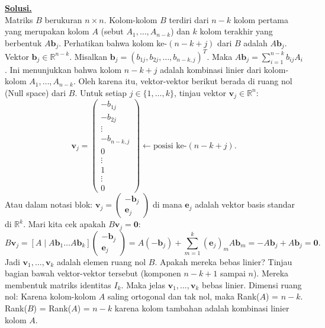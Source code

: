\documentclass[12pt,twoside]{article}
\newenvironment{solution}
{
	\par\noindent\textbf{\underline{Solusi.}}\\
}
{
	\par
}
\begin{document}
\begin{enumerate}
        \begin{solution}
          Matriks $B$ berukuran $n \times n$. Kolom-kolom $B$ terdiri dari $n-k$ kolom pertama yang merupakan kolom $A$ (sebut $A_1, \dots, A_{n-k}$) dan $k$ kolom terakhir yang berbentuk $A\mathbf{b}_j$.
          Perhatikan bahwa kolom ke-$(n-k+j)$ dari $B$ adalah $A\mathbf{b}_j$.
          Vektor $\mathbf{b}_j \in \mathbb{R}^{n-k}$. Misalkan $\mathbf{b}_j = (b_{1j}, b_{2j}, \dots, b_{n-k, j})^T$.
          Maka $A\mathbf{b}_j = \sum_{i=1}^{n-k} b_{ij} A_i$.
          Ini menunjukkan bahwa kolom $n-k+j$ adalah kombinasi linier dari kolom-kolom $A_1, \dots, A_{n-k}$.
          Oleh karena itu, vektor-vektor berikut berada di ruang nol (Null space) dari $B$. Untuk setiap $j \in \{1, \dots, k\}$, tinjau vektor $\mathbf{v}_j \in \mathbb{R}^n$:
          \[ \mathbf{v}_j = \begin{pmatrix} -b_{1j} \\ -b_{2j} \\ \vdots \\ -b_{n-k, j} \\ 0 \\ \vdots \\ 1 \\ \vdots \\ 0 \end{pmatrix} \longleftarrow \text{posisi ke-}(n-k+j). \]
          Atau dalam notasi blok: $\mathbf{v}_j = \begin{pmatrix} -\mathbf{b}_j \\ \mathbf{e}_j \end{pmatrix}$ di mana $\mathbf{e}_j$ adalah vektor basis standar di $\mathbb{R}^k$.
          Mari kita cek apakah $B \mathbf{v}_j = \mathbf{0}$:
          \[ B \mathbf{v}_j = [A \mid A\mathbf{b}_1 \dots A\mathbf{b}_k] \begin{pmatrix} -\mathbf{b}_j \\ \mathbf{e}_j \end{pmatrix} = A(-\mathbf{b}_j) + \sum_{m=1}^k (\mathbf{e}_j)_m A\mathbf{b}_m = -A\mathbf{b}_j + A\mathbf{b}_j = \mathbf{0}. \]
          Jadi $\mathbf{v}_1, \dots, \mathbf{v}_k$ adalah elemen ruang nol $B$.
          Apakah mereka bebas linier?
          Tinjau bagian bawah vektor-vektor tersebut (komponen $n-k+1$ sampai $n$). Mereka membentuk matriks identitas $I_k$. Maka jelas $\mathbf{v}_1, \dots, \mathbf{v}_k$ bebas linier.
          Dimensi ruang nol:
          Karena kolom-kolom $A$ saling ortogonal dan tak nol, maka Rank($A$) = $n-k$.
          Rank($B$) = Rank($A$) = $n-k$ karena kolom tambahan adalah kombinasi linier kolom $A$.

\end{solution}
\end{enumerate}
\end{document}
